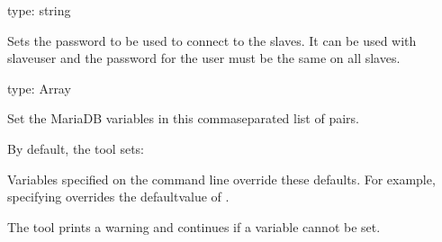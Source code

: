 \documentclass[letterpaper,10pt,english]{sphinxmanual}
\begin{document}

\begin{fulllineitems}
\label{\detokenize{mariadb-kill:cmdoption-mariadb-kill-slave-password}}
type: string

Sets the password to be used to connect to the slaves.
It can be used with \textendash{}slave\sphinxhyphen{}user and the password for the user must be the same
on all slaves.

\end{fulllineitems}


\begin{fulllineitems}
\label{\detokenize{mariadb-kill:cmdoption-mariadb-kill-set-vars}}
type: Array

Set the MariaDB variables in this comma\sphinxhyphen{}separated list of  pairs.

By default, the tool sets:

\begin{sphinxVerbatim}[commandchars=\\\{\}]
\end{sphinxVerbatim}

Variables specified on the command line override these defaults.  For
example, specifying  overrides the defaultvalue of .

The tool prints a warning and continues if a variable cannot be set.

\end{fulllineitems}
\end{document}
